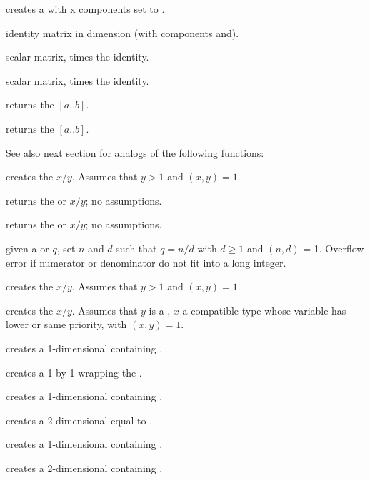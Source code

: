  creates a  with  x
 components set to .

 identity matrix in dimension  (with
components  and).

 scalar matrix,  times the identity.

 scalar matrix,  times
the identity.

 returns the  $[a..b]$.

 returns the  $[a..b]$.

\smallskip
See also next section for analogs of the following functions:

 creates the  $x/y$. Assumes that
$y > 1$ and $(x,y) = 1$.

 returns the  or  $x/y$;
no assumptions.

 returns the  or  $x/y$;
no assumptions.

 given a  or  $q$,
set $n$ and $d$ such that $q = n/d$ with $d \geq 1$ and $(n,d)$ = 1. Overflow
error if numerator or denominator do not fit into a long integer.

 creates the  $x/y$. Assumes that
$y > 1$ and $(x,y) = 1$.

 creates the  $x/y$.
Assumes that $y$ is a , $x$ a compatible type whose variable has
lower or same priority, with $(x,y) = 1$.

 creates a 1-dimensional  containing
.

 creates a 1-by-1  wrapping the 
.

 creates a 1-dimensional  containing
.

 creates a 2-dimensional  equal
to \kbd{[x,y]}.

 creates a 1-dimensional 
containing .

 creates a 2-dimensional 
containing .

